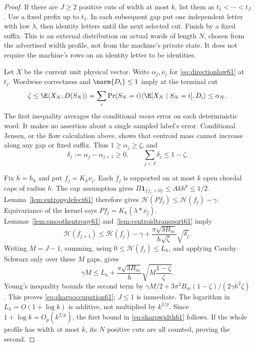 \begin{proof}
If there are $J\ge2$ positive cuts of width at most $k$, list them as
$t_1<\cdots<t_J$. Use a fixed prefix up to $t_1$. In each subsequent
gap put one independent letter with law $\lambda$, then identity
letters until the next selected cut. Finish by a fixed suffix. This is
an external distribution on actual words of length $N$, chosen from the
advertised width profile, not from the machine's private state. It does
not require the machine's rows on an identity letter to be identities.

Let $X$ be the current unit physical vector. Write $\alpha_j,\nu_j$
for \eqref{eq:directionlaw61} at $t_j$. Wordwise correctness and
$\norm{D_i}\le1$ imply at the terminal cut
\[
 \zeta\le\E\langle X_N,D(S_N)\rangle
       =\sum_i\Pr(S_N=i)\langle\E[X_N\mid S_N=i],D_i\rangle
       \le\alpha_N.
\]
The first inequality averages the conditional \emph{mean} error on
each deterministic word. It makes no assertion about a single sampled
label's error. Conditional Jensen, or the flow calculation above,
shows that centroid mass cannot increase along any gap or fixed
suffix. Thus $1\ge\alpha_j\ge\zeta$, and
\[
 \delta_j:=\alpha_j-\alpha_{j+1}\ge0,\qquad
                         \sum_{j<J}\delta_j\le1-\zeta.
\]

Fix $h=h_k$ and put $f_j=K_h\nu_j$. Each $f_j$ is supported on at most
$k$ open chordal caps of radius $h$. The cap assumption gives
$\Pi\mathbf1_{\{f_j>0\}}\le Akh^p\le1/2$.
Lemma~\ref{lem:entropydefect61} therefore gives
$\mathcal H(Pf_j)\le\mathcal H(f_j)-\gamma$.
Equivariance of the kernel says $Pf_j=K_h(\lambda*\nu_j)$.
Lemmas~\ref{lem:smoothentropy61} and~\ref{lem:centroidtransport61} imply
\[
 \mathcal H(f_{j+1})\le\mathcal H(f_j)-\gamma
              +\frac{\pi\sqrt{3B_m}}{h\sqrt\zeta}\sqrt{\delta_j}.
\]
Writing $M=J-1$, summing, using $0\le\mathcal H(f_j)\le L_h$, and
applying Cauchy--Schwarz only over these $M$ gaps, gives
\begin{equation}\label{eq:entropybudget61}
 \gamma M\le L_h+
       \frac{\pi\sqrt{3B_m}}h\sqrt{M\frac{1-\zeta}{\zeta}}.
\end{equation}
Young's inequality bounds the second term by $\gamma M/2+
3\pi^2B_m(1-\zeta)/(2\gamma h^2\zeta)$. This proves
\eqref{eq:sharpoccupation61}; $J\le1$ is immediate. The logarithm
in $L_h=O(1+\log k)$ is additive, not multiplied by $k^{2/p}$.
Since $1+\log k=O_p(k^{2/p})$, the first bound in
\eqref{eq:sharpwidth61} follows. If the whole profile has width at
most $k$, its $N$ positive cuts are all counted, proving the second.
\end{proof}

